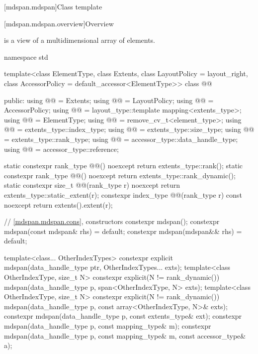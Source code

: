 [mdspan.mdspan]{Class template }

[mdspan.mdspan.overview]{Overview}

\pnum
{} is a view of a multidimensional array of elements.

\begin{codeblock}
namespace std {
  template<class ElementType, class Extents, class LayoutPolicy = layout_right,
           class AccessorPolicy = default_accessor<ElementType>>
  class @@ {
  public:
    using @@ = Extents;
    using @@ = LayoutPolicy;
    using @@ = AccessorPolicy;
    using @@ = layout_type::template mapping<extents_type>;
    using @@ = ElementType;
    using @@ = remove_cv_t<element_type>;
    using @@ = extents_type::index_type;
    using @@ = extents_type::size_type;
    using @@ = extents_type::rank_type;
    using @@ = accessor_type::data_handle_type;
    using @@ = accessor_type::reference;

    static constexpr rank_type @@() noexcept { return extents_type::rank(); }
    static constexpr rank_type @@() noexcept { return extents_type::rank_dynamic(); }
    static constexpr size_t @@(rank_type r) noexcept
      { return extents_type::static_extent(r); }
    constexpr index_type @@(rank_type r) const noexcept { return extents().extent(r); }

    // \ref{mdspan.mdspan.cons}, constructors
    constexpr mdspan();
    constexpr mdspan(const mdspan& rhs) = default;
    constexpr mdspan(mdspan&& rhs) = default;

    template<class... OtherIndexTypes>
      constexpr explicit mdspan(data_handle_type ptr, OtherIndexTypes... exts);
    template<class OtherIndexType, size_t N>
      constexpr explicit(N != rank_dynamic())
        mdspan(data_handle_type p, span<OtherIndexType, N> exts);
    template<class OtherIndexType, size_t N>
      constexpr explicit(N != rank_dynamic())
        mdspan(data_handle_type p, const array<OtherIndexType, N>& exts);
    constexpr mdspan(data_handle_type p, const extents_type& ext);
    constexpr mdspan(data_handle_type p, const mapping_type& m);
    constexpr mdspan(data_handle_type p, const mapping_type& m, const accessor_type& a);

}}
\end{codeblock}
